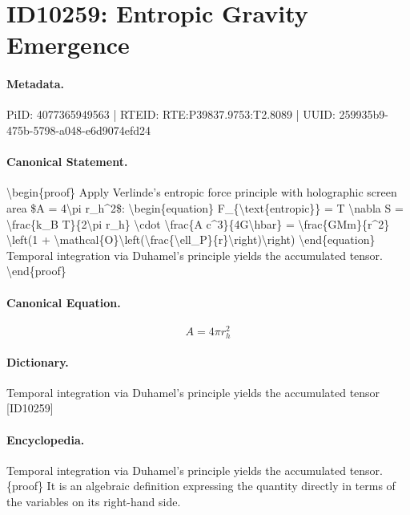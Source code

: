 \section*{ID10259: Entropic Gravity Emergence}
\paragraph{Metadata.}
PiID: 4077365949563 | RTEID: RTE:P39837.9753:T2.8089 | UUID: 259935b9-475b-5798-a048-e6d9074efd24

\paragraph{Canonical Statement.}
\textbackslash{}begin\{proof\} Apply Verlinde's entropic force principle with holographic screen area \$A = 4\textbackslash{}pi r\_h\textasciicircum{}2\$: \textbackslash{}begin\{equation\} F\_\{\textbackslash{}text\{entropic\}\} = T \textbackslash{}nabla S = \textbackslash{}frac\{k\_B T\}\{2\textbackslash{}pi r\_h\} \textbackslash{}cdot \textbackslash{}frac\{A c\textasciicircum{}3\}\{4G\textbackslash{}hbar\} = \textbackslash{}frac\{GMm\}\{r\textasciicircum{}2\} \textbackslash{}left(1 + \textbackslash{}mathcal\{O\}\textbackslash{}left(\textbackslash{}frac\{\textbackslash{}ell\_P\}\{r\}\textbackslash{}right)\textbackslash{}right) \textbackslash{}end\{equation\} Temporal integration via Duhamel's principle yields the accumulated tensor. \textbackslash{}end\{proof\}

\paragraph{Canonical Equation.}
\[
A = 4\pi r_h^2
\]

\paragraph{Dictionary.}
Temporal integration via Duhamel's principle yields the accumulated tensor [ID10259]

\paragraph{Encyclopedia.}
Temporal integration via Duhamel's principle yields the accumulated tensor. \{proof\} It is an algebraic definition expressing the quantity directly in terms of the variables on its right-hand side.
